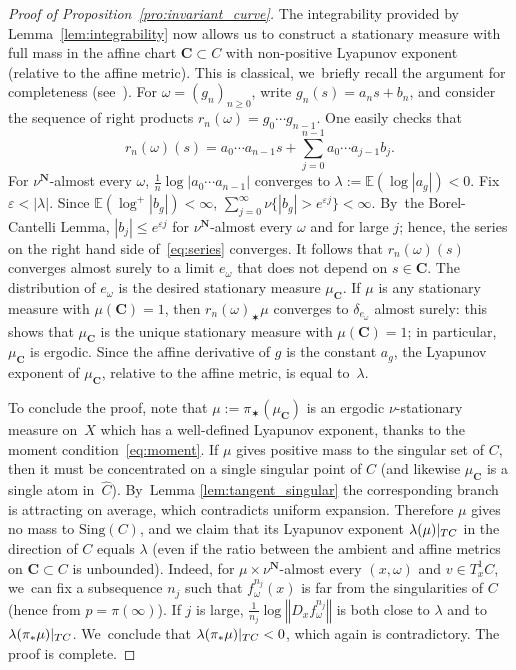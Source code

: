 \documentclass[11pt]{article}
\let\e\varepsilon
\newcommand{\norm}[1]{{\left\Vert#1\right\Vert}}
\newcommand{\abs}[1]{\left\vert#1\right\vert}
\newcommand{\rest}[1]{ \arrowvert_{#1}}
\newcommand{\unsur}[1]{\frac{1}{#1}}
\newcommand{\ee}{\mathbb{E}}
\def\C{\mathbf{C}}
\def\N{\mathbf{N}}
\newcommand{\Sing}{{\mathrm{Sing}}}
\theoremstyle{plain}
\theoremstyle{definition}
\numberwithin{equation}{section}
\begin{document}
\begin{proof}[Proof of Proposition~\ref{pro:invariant_curve}]
The integrability provided by Lemma~\ref{lem:integrability} now allows us to construct a stationary
measure with full mass in the affine chart $\C\subset C$ with non-positive Lyapunov exponent
(relative to the affine metric).
This is classical, we~briefly recall the argument for completeness (see~\cite{brandt}).
For $\omega = (g_n)_{n\geq 0}$, write $g_n(s) = a_ns+b_n$, and
consider the sequence of right products
$r_n(\omega) = g_0\cdots g_{n-1}$. One easily checks that
\begin{equation}\label{eq:series}
r_n(\omega) (s) = a_{0}\cdots a_{n-1}s + \sum_{j=0}^{n-1} a_{0}\cdots a_{j-1} b_{j}.
\end{equation}
For $\nu^\N$-almost every $\omega$, $\unsur{n} \log \abs{a_{0}\cdots a_{n-1}}$ converges to $\lambda := \ee(\log\abs{a_g})<0$.
Fix $\e < \abs{\lambda}$. Since $\ee(\log^+\abs{b_g})<\infty$, $\sum_{j=0}^\infty \nu\{ \abs{b_g} > e^{\e j} \} <\infty$. By~the Borel-Cantelli Lemma, $\abs{b_{j}}\leq e^{\e j} $ for $\nu^\N$-almost every $\omega$ and for large $j$; hence, the series on
the right hand side of~\eqref{eq:series} converges. It follows that $r_n(\omega) (s) $ converges almost surely to a limit $e_\omega$
that does not depend on $s\in \C$. The distribution of $e_\omega$ is the desired stationary measure $\mu_\C$.
If $\mu$ is any stationary measure with $\mu(\C) = 1$, then $r_n(\omega)_\varstar \mu$ converges to
$\delta_{e_\omega}$ almost surely: this shows that $\mu_\C$ is the unique stationary measure
with $\mu(\C) = 1$; in particular, $\mu_\C$ is ergodic.
Since the affine derivative of $g$ is the constant $a_g$,
the Lyapunov exponent of $\mu_\C$, relative to the affine metric, is equal to~$\lambda$.

To conclude the proof, note that $\mu:=\pi_\varstar (\mu_\C)$ is an ergodic
$\nu$-stationary measure on~$X$ which has a well-defined Lyapunov exponent, thanks to the moment condition~\eqref{eq:moment}.
If $\mu$ gives positive mass to the singular set of $C$, then it must be concentrated on a
single singular point of $C$ (and likewise $\mu_\C$ is a single atom in~$\hat C$). By~Lemma \ref{lem:tangent_singular} the corresponding branch is
attracting on average, which contradicts uniform expansion. Therefore $\mu$ gives no mass to
$\Sing(C)$, and we claim that its Lyapunov exponent $\lambda(\mu)\rest{TC}$
in the direction of $C$ equals $\lambda$ (even if the ratio between the
ambient and affine metrics on $\C\subset C$ is unbounded). Indeed, for
$\mu\times \nu^\N$-almost every $(x,\omega)$ and $v\in T_x^1C$, we~can fix a subsequence $n_j$ such that $f^{n_j}_\omega(x)$ is far
from the singularities of $C$ (hence from $p=\pi(\infty)$). If $j$ is large,
$\unsur{n_j}\log\norm{D_xf^{n_j}_\omega}$ is both close to $\lambda$ and to
$\lambda (\pi_\varstar \mu)\rest{TC}$. We~conclude that $\lambda (\pi_\varstar \mu)\rest{TC}<0$, which again is contradictory. The proof is complete. \end{proof}
\end{document}
